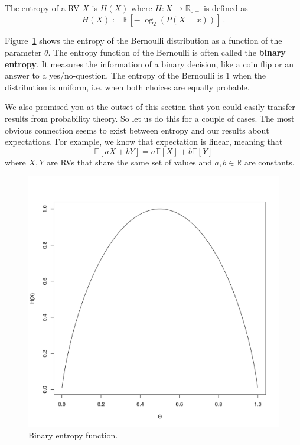 \begin{Definition}[Entropy]
The entropy of a RV $ X $ is $ H(X) $ where $ H : X \rightarrow \mathbb{R}_{0+} $ is defined as
$$ H(X) := \mathbb{E}[-\log_{2}(P(X=x))] \ . $$
\end{Definition}

Figure~\ref{fig:binaryEntropy} shows the entropy of the Bernoulli distribution as a function of the
parameter $ \theta $. The entropy function of the Bernoulli is often called the \textbf{binary entropy}.
It measures the information of a binary decision, like a coin flip or an answer to a yes/no-question.
The entropy of the Bernoulli is 1 when the distribution is uniform, i.e. when both choices are equally 
probable. 

We also promised you at the outset of this section that you could easily transfer results from probability
theory.  So let us do this for a couple of cases. The most obvious connection seems to exist between
entropy and our results about expectations. For example, we know that expectation is linear, meaning
that
\begin{equation}
\mathbb{E}[aX + bY] = a\mathbb{E}[X] + b\mathbb{E}[Y]
\end{equation}
where $ X,Y $ are RVs that share the same set of values and $ a,b \in \mathbb{R} $ are constants.
\begin{figure}
\center
\includegraphics[scale=0.5]{binaryEntropy.png}
\caption{Binary entropy function.}
\label{fig:binaryEntropy}
\end{figure}

